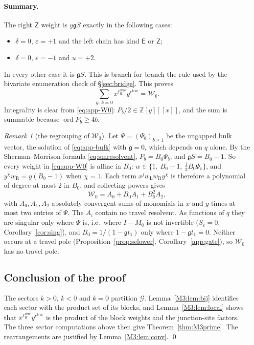 \documentclass[11pt]{article}
\theoremstyle{plain}
\theoremstyle{definition}
\theoremstyle{remark}
\newtheorem{remark}[theorem]{Remark}
\begin{document}
\paragraph{Summary.}
The right $\mathsf Z$ weight is $y\mathfrak gS$ exactly in the following cases:
\begin{itemize}
\item $\delta=0$, $\varepsilon=+1$ and the left chain has kind $\mathsf E$ or $\mathsf Z$;
\item $\delta=0$, $\varepsilon=-1$ and $u=+2$.
\end{itemize}
In every other case it is $\mathfrak gS$. This is branch for branch the rule used by the
bivariate enumeration check of \S\ref{sec:bridge}. This proves
\[
  \sum_{g:\,k=0}x^{\ell_R^{\mathrm{true}}}y^{c^{\mathrm{true}}}=\mathcal W_0 .
\]
Integrality is clear from \eqref{eq:app-W0}: $P_b/2\in\mathbb Z[y][[x]]$, and the sum is
summable because $\operatorname{ord}P_b\ge4b$.

\begin{remark}[the regrouping of $\mathcal W_0$]\label{M3:rem:W0regroup}
Let $\Psi=(\Psi_b)_{b\ge1}$ be the ungapped bulk vector, the solution of \eqref{eq:app-bulk} with
$\mathfrak g=0$, which depends on $q$ alone. By the Sherman--Morrison formula
\eqref{eq:smresolvent}, $P_b=B_0\Psi_b$, and $\mathfrak gS=B_0-1$. So every weight in
\eqref{eq:app-W0} is affine in $B_0$: $w\in\{1,\ B_0-1,\ \tfrac12B_0\Psi_b\}$, and $y^\chi w_{\mathrm R}=y(B_0-1)$
when $\chi=1$. Each term $x^jw_{\mathrm L}w_{\mathrm R}y^\chi$ is therefore a polynomial of degree
at most $2$ in $B_0$, and collecting powers gives
\[
   \mathcal W_0=A_0+B_0A_1+B_0^2A_2,
\]
with $A_0,A_1,A_2$ absolutely convergent sums of monomials in $x$ and $y$ times at most two entries
of $\Psi$. The $A_i$ contain no travel resolvent. As functions of $q$ they
are singular only where $\Psi$ is, i.e.\ where $I-M_0$ is not invertible ($S_e=0$,
Corollary~\ref{cor:sing}), and $B_0=1/(1-\mathfrak gt_1)$ only where $1-\mathfrak gt_1=0$. Neither
occurs at a travel pole (Proposition~\ref{prop:selower}, Corollary~\ref{app:gate}), so
$\mathcal W_0$ has no travel pole.
\end{remark}

\subsection{Conclusion of the proof}

The sectors $k>0$, $k<0$ and $k=0$ partition $\mathcal G$. Lemma~\ref{M3:lem:bij} identifies each
sector with the product set of its blocks, and Lemma~\ref{M3:lem:local} shows that
$x^{\ell_R^{\mathrm{true}}}y^{c^{\mathrm{true}}}$ is the product of the block weights and the
junction-site factors. The three sector computations above then give
Theorem~\ref{thm:M3prime}. The rearrangements are justified by Lemma~\ref{M3:lem:conv}. \qed
\end{document}
